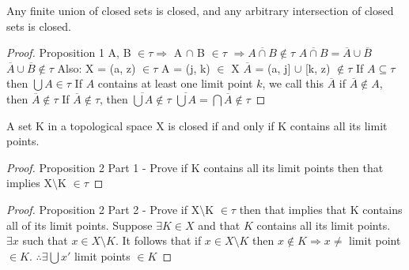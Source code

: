 \documentclass{article}
\begin{document}
  \begin{proposition}
      Any finite union of closed sets is closed, and any arbitrary intersection of closed sets is closed.
  \end{proposition}

  \begin{proof}
  	Proposition 1
  	\newline
	A, B $\in \tau \Rightarrow$ A $\cap$ B $\in \tau$ $\Rightarrow \overline{A \cap B} \not\in \tau$
	\newline
	$\overline{A \cap B} = \overline{A} \cup \overline{B}$
	\newline
	$\overline{A} \cup \overline{B} \not\in \tau$
	\newline \newline
	Also:
	\newline
	X = (a, z) $\in \tau$
	\newline
	A = (j, k) $\in$ X
	\newline
	$\overline{A}$ = (a, j] $\cup$ [k, z) $\not\in \tau$
	\newline \newline
	If $A \subseteq \tau$ then $\bigcup A \in \tau$
	\newline
	If $A$ contains at least one limit point $k$, we call this $\overline{A}$ if $\overline{A} \not\in A$, then $\overline{A} \not\in \tau$
	\newline
	If $\overline{A} \not\in \tau$, then $\overline{\bigcup A} \not\in \tau$
	\newline
	$\overline{\bigcup A} = \bigcap \overline{A} \not\in \tau$
  \end{proof}



	\begin{proposition}
		A set K in a topological space X is closed if and only if K contains all its limit points.
	\end{proposition}
	\begin{proof}
		Proposition 2 Part 1 - Prove if K contains all its limit points then that implies X$\setminus$K $\in \tau$

	\end{proof}
	\begin{proof}
	Proposition 2 Part 2 - Prove if X$\setminus$K $\in \tau$ then that implies that K contains all of its limit points.
		\newline
		Suppose $\exists K \in X$ and that $K$ contains all its limit points.
		\newline
		$\exists  x$ such that $x \in X \setminus K$. It follows that if $x \in X \setminus K$ then $x \not\in K \Rightarrow x \neq $ limit point $\in K$. $\therefore \exists \bigcup x'$ limit points $\in K$
	\end{proof}
\end{document}
